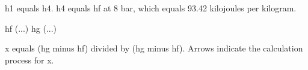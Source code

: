 h1 equals h4.  
h4 equals hf at 8 bar, which equals 93.42 kilojoules per kilogram.  

hf (...)  
hg (...)  

x equals (hg minus hf) divided by (hg minus hf).  
Arrows indicate the calculation process for x.